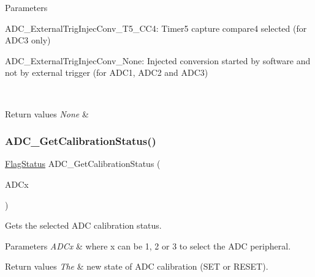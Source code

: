 \begin{DoxyParams}{Parameters}
\begin{DoxyItemize}
\item A\+D\+C\+\_\+\+External\+Trig\+Injec\+Conv\+\_\+\+T5\+\_\+\+C\+C4\+: Timer5 capture compare4 selected (for A\+D\+C3 only)\end{DoxyItemize}
\begin{DoxyItemize}
\item A\+D\+C\+\_\+\+External\+Trig\+Injec\+Conv\+\_\+\+None\+: Injected conversion started by software and not by external trigger (for A\+D\+C1, A\+D\+C2 and A\+D\+C3) \end{DoxyItemize}
\\
\hline
\end{DoxyParams}

\begin{DoxyRetVals}{Return values}
{\em None} & \\
\hline
\end{DoxyRetVals}
\mbox{\label{group___a_d_c___private___functions_ga7a728f699b487c7fa1694d7424967122}} 
\subsubsection{\texorpdfstring{ADC\_GetCalibrationStatus()}{ADC\_GetCalibrationStatus()}}
{\footnotesize\ttfamily \mbox{\hyperlink{group___exported__types_ga89136caac2e14c55151f527ac02daaff}{Flag\+Status}} A\+D\+C\+\_\+\+Get\+Calibration\+Status (\begin{DoxyParamCaption}\item[{\mbox{\hyperlink{struct_a_d_c___type_def}{A\+D\+C\+\_\+\+Type\+Def}} $\ast$}]{A\+D\+Cx }\end{DoxyParamCaption})}



Gets the selected A\+DC calibration status. 


\begin{DoxyParams}{Parameters}
{\em A\+D\+Cx} & where x can be 1, 2 or 3 to select the A\+DC peripheral. \\
\hline
\end{DoxyParams}

\begin{DoxyRetVals}{Return values}
{\em The} & new state of A\+DC calibration (S\+ET or R\+E\+S\+ET). \\
\hline
\end{DoxyRetVals}
\mbox{\label{group___a_d_c___private___functions_gaaf74221c285ec5dab5e66baf7bec6bd3}} 

